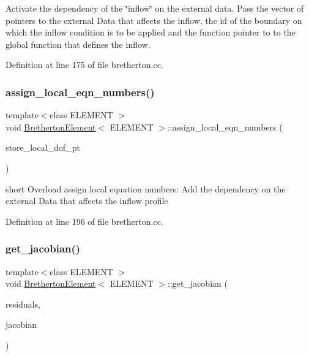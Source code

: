 Activate the dependency of the \char`\"{}inflow\char`\"{} on the external data. Pass the vector of pointers to the external Data that affects the inflow, the id of the boundary on which the inflow condition is to be applied and the function pointer to to the global function that defines the inflow. 



Definition at line 175 of file bretherton.\+cc.

\mbox{\label{classBrethertonElement_a40f35d9e03eae08954b6b32badadcf61}} 
\subsubsection{\texorpdfstring{assign\+\_\+local\+\_\+eqn\+\_\+numbers()}{assign\_local\_eqn\_numbers()}}
{\footnotesize\ttfamily template$<$class E\+L\+E\+M\+E\+NT $>$ \\
void \hyperlink{classBrethertonElement}{Bretherton\+Element}$<$ E\+L\+E\+M\+E\+NT $>$\+::assign\+\_\+local\+\_\+eqn\+\_\+numbers (\begin{DoxyParamCaption}\item[{const bool \&}]{store\+\_\+local\+\_\+dof\+\_\+pt }\end{DoxyParamCaption})\hspace{0.3cm}{\ttfamily [inline]}}

short Overload assign local equation numbers\+: Add the dependency on the external Data that affects the inflow profile 

Definition at line 196 of file bretherton.\+cc.

\mbox{\label{classBrethertonElement_ab0bc00d862b2c888703ed38c74f18b77}} 
\subsubsection{\texorpdfstring{get\+\_\+jacobian()}{get\_jacobian()}}
{\footnotesize\ttfamily template$<$class E\+L\+E\+M\+E\+NT $>$ \\
void \hyperlink{classBrethertonElement}{Bretherton\+Element}$<$ E\+L\+E\+M\+E\+NT $>$\+::get\+\_\+jacobian (\begin{DoxyParamCaption}\item[{Vector$<$ double $>$ \&}]{residuals,  }\item[{Dense\+Matrix$<$ double $>$ \&}]{jacobian }\end{DoxyParamCaption})\hspace{0.3cm}{\ttfamily [inline]}}


